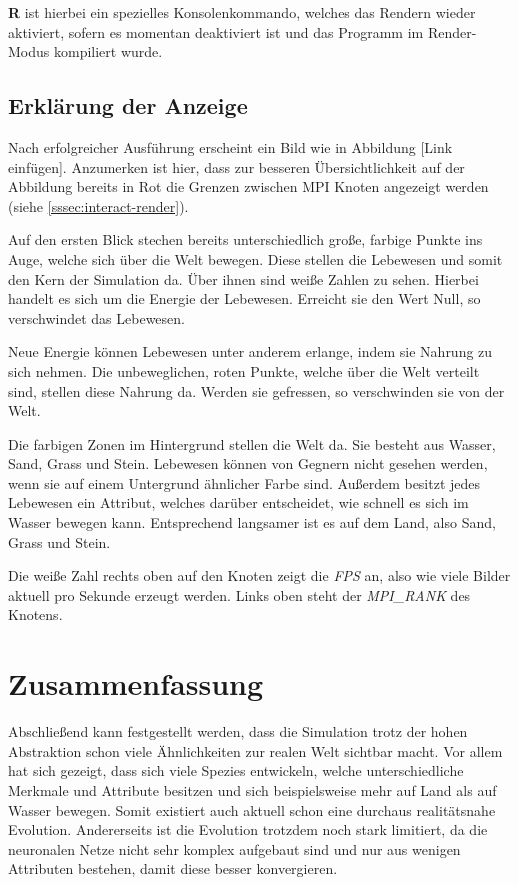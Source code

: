 \documentclass[course=erap]{aspdoc}
\begin{document}
\textbf{R} ist hierbei ein spezielles Konsolenkommando, welches das Rendern wieder aktiviert, sofern es momentan deaktiviert ist und das Programm im Render-Modus kompiliert wurde.

\subsection{Erklärung der Anzeige}
Nach erfolgreicher Ausführung erscheint ein Bild wie in Abbildung [Link einfügen]. Anzumerken ist hier, dass zur besseren Übersichtlichkeit auf der Abbildung bereits in Rot die Grenzen zwischen MPI Knoten angezeigt werden (siehe \ref{sssec:interact-render}).

Auf den ersten Blick stechen bereits unterschiedlich große, farbige Punkte ins Auge, welche sich über die Welt bewegen. Diese stellen die Lebewesen und somit den Kern der Simulation da. Über ihnen sind weiße Zahlen zu sehen. Hierbei handelt es sich um die Energie der Lebewesen. Erreicht sie den Wert Null, so verschwindet das Lebewesen.

Neue Energie können Lebewesen unter anderem erlange, indem sie Nahrung zu sich nehmen. Die unbeweglichen, roten Punkte, welche über die Welt verteilt sind, stellen diese Nahrung da. Werden sie gefressen, so verschwinden sie von der Welt.

Die farbigen Zonen im Hintergrund stellen die Welt da. Sie besteht aus Wasser, Sand, Grass und Stein. Lebewesen können von Gegnern nicht gesehen werden, wenn sie auf einem Untergrund ähnlicher Farbe sind. Außerdem besitzt jedes Lebewesen ein Attribut, welches darüber entscheidet, wie schnell es sich im Wasser bewegen kann. Entsprechend langsamer ist es auf dem Land, also Sand, Grass und Stein.

Die weiße Zahl rechts oben auf den Knoten zeigt die \emph{FPS} an, also wie viele Bilder aktuell pro Sekunde erzeugt werden. Links oben steht der \emph{MPI\_RANK} des Knotens.


\section{Zusammenfassung}
Abschließend kann festgestellt werden, dass die Simulation trotz der hohen Abstraktion schon viele Ähnlichkeiten zur realen Welt sichtbar macht. Vor allem hat sich gezeigt, dass sich viele Spezies entwickeln, welche unterschiedliche Merkmale und Attribute besitzen und sich beispielsweise mehr auf Land als auf Wasser bewegen. Somit existiert auch aktuell schon eine durchaus realitätsnahe Evolution. Andererseits ist die Evolution trotzdem noch stark limitiert, da die neuronalen Netze nicht sehr komplex aufgebaut sind und nur aus wenigen Attributen bestehen, damit diese besser konvergieren.
\end{document}
